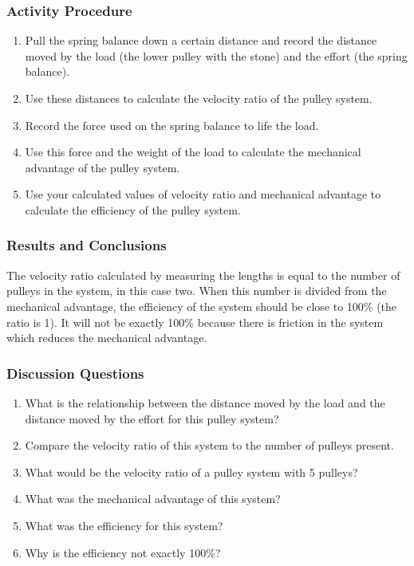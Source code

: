 \subsubsection*{Activity Procedure}
\begin{enumerate}
\item{Pull the spring balance down a certain distance and record the distance moved by the load (the lower pulley with the stone) and the effort (the spring balance).}
\item{Use these distances to calculate the velocity ratio of the pulley system.}
\item{Record the force used on the spring balance to life the load.}
\item{Use this force and the weight of the load to calculate the mechanical advantage of the pulley system.}
\item{Use your calculated values of velocity ratio and mechanical advantage to calculate the efficiency of the pulley system.}
\end{enumerate}

\subsubsection*{Results and Conclusions}
The velocity ratio calculated by measuring the lengths is equal to the number of pulleys in the system, in this case two.  When this number is divided from the mechanical advantage, the efficiency of the system should be close to 100\% (the ratio is 1).  It will not be exactly 100\% because there is friction in the system which reduces the mechanical advantage.


\subsubsection*{Discussion Questions}
\begin{enumerate}
\item{What is the relationship between the distance moved by the load and the distance moved by the effort for this pulley system?}
\item{Compare the velocity ratio of this system to the number of pulleys present.}
\item{What would be the velocity ratio of a pulley system with 5 pulleys?}
\item{What was the mechanical advantage of this system?}
\item{What was the efficiency for this system?}
\item{Why is the efficiency not exactly 100\%?}
\end{enumerate}

